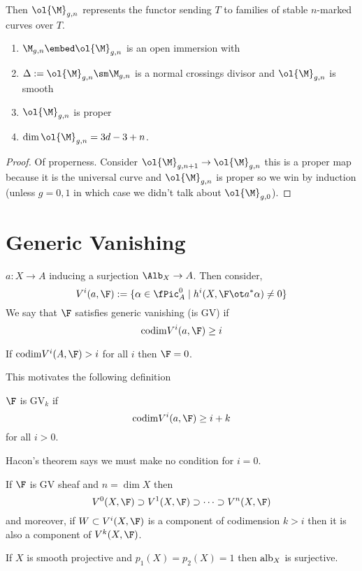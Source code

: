 \documentclass[12pt]{article}
\theoremstyle{plain}
\begin{document}
Then $\ol{\M}_{g,n}$ represents the functor sending $T$ to families of stable $n$-marked curves over $T$. 

\begin{enumerate}
\item $\M_{g,n} \embed \ol{\M}_{g,n}$ is an open immersion with 
\item $\Delta := \ol{\M}_{g,n} \sm \M_{g,n}$ is a normal crossings divisor and $\ol{\M}_{g,n}$ is smooth
\item $\ol{\M}_{g,n}$ is proper
\item $\dim \ol{\M}_{g,n} = 3d - 3 + n$. 
\end{enumerate}

\begin{proof}
Of properness. Consider $\ol{\M}_{g,n+1} \to \ol{\M}_{g,n}$ this is a proper map because it is the universal curve and $\ol{\M}_{g,n}$ is proper so we win by induction (unless $g = 0,1$ in which case we didn't talk about $\ol{\M}_{g,0}$). 
\end{proof}

\section{Generic Vanishing}

$a : X \to A$ inducing a surjection $\Alb_X \to A$. Then consider,
\[ V^i(a, \F) := \{ \alpha \in \fPic^0_A \mid h^i(X, \F \ot a^* \alpha) \neq 0 \} \]
We say that $\F$ satisfies generic vanishing (is GV) if 
\[ \codim {V^i(a, \F)} \ge i \]

\begin{theorem}[Hacon]
If $\codim {V^i(A, \F)} > i$ for all $i$ then $\F = 0$.
\end{theorem}

This motivates the following definition
\begin{defn}
$\F$ is $\text{GV}_k$ if 
\[ \codim{V^i(a, \F)} \ge i + k \]
for all $i > 0$.
\end{defn}

Hacon's theorem says we must make no condition for $i = 0$. 

\begin{prop}
If $\F$ is GV sheaf and $n = \dim{X}$ then
\[ V^0(X, \F) \supset V^1(X, \F) \supset \cdots \supset V^n(X, \F) \]
and moreover, if $W \subset V^i(X, \F)$ is a component of codimension $k > i$ then it is also a component of $V^k(X, \F)$.
\end{prop}

\begin{theorem}
If $X$ is smooth projective and $p_1(X) = p_2(X) = 1$ then $\mathrm{alb}_X$ is surjective. 
\end{theorem}
\end{document}
